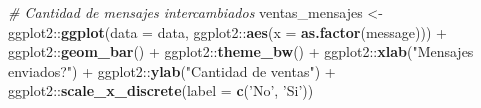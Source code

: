 \documentclass[
  12pt]{article}
\newenvironment{Shaded}{}{}
\newcommand{\CommentTok}[1]{\textcolor[rgb]{0.38,0.63,0.69}{\textit{#1}}}
\newcommand{\DataTypeTok}[1]{\textcolor[rgb]{0.56,0.13,0.00}{#1}}
\newcommand{\KeywordTok}[1]{\textcolor[rgb]{0.00,0.44,0.13}{\textbf{#1}}}
\newcommand{\NormalTok}[1]{#1}
\newcommand{\OperatorTok}[1]{\textcolor[rgb]{0.40,0.40,0.40}{#1}}
\newcommand{\StringTok}[1]{\textcolor[rgb]{0.25,0.44,0.63}{#1}}
\begin{document}
\begin{Shaded}
\begin{Highlighting}[]
{{{{\CommentTok{# Cantidad de mensajes intercambiados}
\NormalTok{ventas_mensajes <-}\StringTok{ }\NormalTok{ggplot2}\OperatorTok{::}\KeywordTok{ggplot}\NormalTok{(}\DataTypeTok{data =}\NormalTok{ data, ggplot2}\OperatorTok{::}\KeywordTok{aes}\NormalTok{(}\DataTypeTok{x =} \KeywordTok{as.factor}\NormalTok{(message))) }\OperatorTok{+}
\StringTok{  }\NormalTok{ggplot2}\OperatorTok{::}\KeywordTok{geom_bar}\NormalTok{() }\OperatorTok{+}
\StringTok{  }\NormalTok{ggplot2}\OperatorTok{::}\KeywordTok{theme_bw}\NormalTok{() }\OperatorTok{+}
\StringTok{  }\NormalTok{ggplot2}\OperatorTok{::}\KeywordTok{xlab}\NormalTok{(}\StringTok{"Mensajes enviados?"}\NormalTok{) }\OperatorTok{+}\StringTok{ }\NormalTok{ggplot2}\OperatorTok{::}\KeywordTok{ylab}\NormalTok{(}\StringTok{"Cantidad de ventas"}\NormalTok{) }\OperatorTok{+}
\StringTok{  }\NormalTok{ggplot2}\OperatorTok{::}\KeywordTok{scale_x_discrete}\NormalTok{(}\DataTypeTok{label =} \KeywordTok{c}\NormalTok{(}\StringTok{'No'}\NormalTok{, }\StringTok{'Si'}\NormalTok{))}

}}}}
\end{Highlighting}
\end{Shaded}
\end{document}

